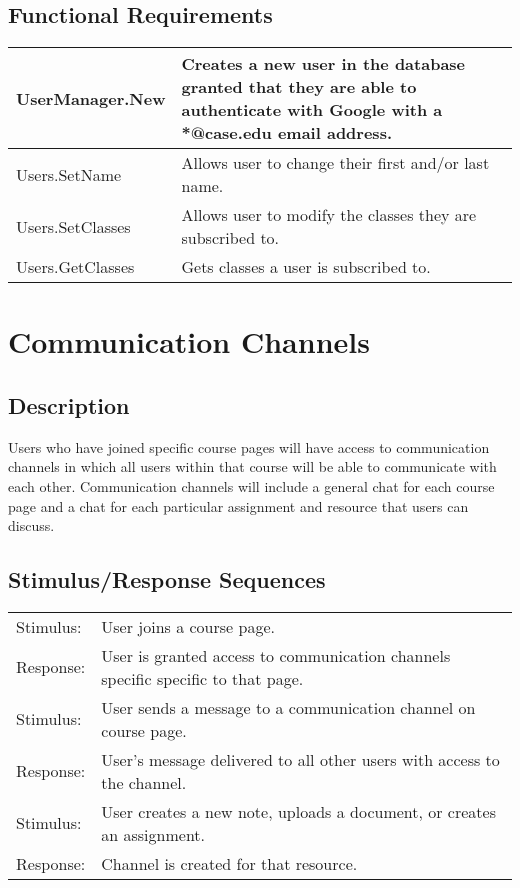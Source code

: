 \documentclass{scrreprt}
\begin{document}
\subsection{Functional Requirements}

\begin{tabular}{| p{3cm} | p{11cm} |}
\hline
UserManager.New & Creates a new user in the database granted that they are able to authenticate with Google with a *@case.edu email address. \\ \hline
Users.SetName & Allows user to change their first and/or last name. \\ \hline
Users.SetClasses & Allows user to modify the classes they are subscribed to. \\ \hline
Users.GetClasses & Gets classes a user is subscribed to. \\
\hline
\end{tabular}

\section{Communication Channels}
\subsection{Description}
Users who have joined specific course pages will have access to communication channels in which all users within that course will be able to communicate with each other. Communication channels will include a general chat for each course page and a chat for each particular assignment and resource that users can discuss.

\subsection{Stimulus/Response Sequences}
\begin{tabular}{| p{2cm} | p{12cm} | }
	\hline
	Stimulus: & User joins a course page. \\
	Response: & User is granted access to communication channels specific specific to that page. \\ \hline
	Stimulus: & User sends a message to a communication channel on course page. \\
	Response: & User’s message delivered to all other users with access to the channel. \\ \hline
	Stimulus: & User creates a new note, uploads a document, or creates an assignment. \\
	Response: & Channel is created for that resource. \\
	\hline
\end{tabular}
\end{document}
